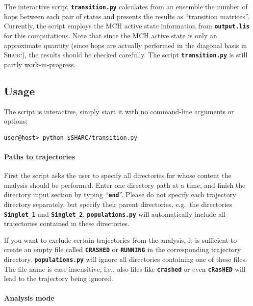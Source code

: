 \documentclass[a4paper,11pt,DIV=15,openany,twoside=false]{scrbook}
\newcommand{\ttt}[1]{\textbf{\texttt{#1}}}
\begin{document}
The interactive script \ttt{transition.py} calculates from an ensemble the number of hops between each pair of states and presents the results as ``transition matrices''.
Currently, the script employs the MCH active state information from \ttt{output.lis} for this computations. 
Note that since the MCH active state is only an approximate quantity (since hops are actually performed in the diagonal basis in \textsc{Sharc}), the results should be checked carefully.
The script \ttt{transition.py} is still partly work-in-progress.

\subsection{Usage}

The script is interactive, simply start it with no command-line arguments or options:
\begin{verbatim}
user@host> python $SHARC/transition.py
\end{verbatim}

\paragraph{Paths to trajectories}

First the script asks the user to specify all directories for whose content the analysis should be performed. Enter one directory path at a time, and finish the directory input section by typing ``\ttt{end}''. Please do not specify each trajectory directory separately, but specify their parent directories, e.g.\ the directories \ttt{Singlet\_1} and \ttt{Singlet\_2}. \ttt{populations.py} will automatically include all trajectories contained in these directories.

If you want to exclude certain trajectories from the analysis, it is sufficient to create an empty file called \ttt{CRASHED} or \ttt{RUNNING} in the corresponding trajectory directory. \ttt{populations.py} will ignore all directories containing one of these files. The file name is case insensitive, i.e., also files like \ttt{crashed} or even \ttt{cRasHED} will lead to the trajectory being ignored.

\paragraph{Analysis mode}
\end{document}

